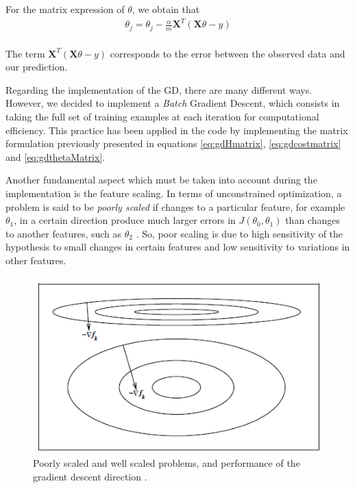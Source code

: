 \documentclass[a4paper, report, oneside, UKenglish]{memoir}
\begin{document}
For the matrix expression of $\theta$, we obtain that
\begin{equation}\label{eq:gdthetaMatrix}
\begin{split}
    \theta_{j} = \theta_{j} - \frac{\alpha}{m}\textbf{X}^T(\textbf{X}\theta - y)\\
\end{split}
\end{equation}

The term $\textbf{X}^T(\textbf{X}\theta - y)$ corresponds to the error between the observed data and our prediction.

Regarding the implementation of the GD, there are many different ways. However, we decided to implement a \textit{Batch} Gradient Descent, which consists in taking the full set of training examples at each iteration for computational efficiency. This practice has been applied in the code by implementing the matrix formulation previously presented in equations \eqref{eq:gdHmatrix}, \eqref{eq:gdcostmatrix} and \eqref{eq:gdthetaMatrix}.

Another fundamental aspect which must be taken into account during the implementation is the feature scaling. In terms of unconstrained optimization, a problem is said to be \textit{poorly scaled} if changes to a particular feature, for example $\theta_{1}$, in a certain direction produce much larger errors in $J(\theta_{0},\theta_{1})$ than changes to another features, such as $\theta_{2}$ \cite{numericalopt}. So, poor scaling is due to high sensitivity of the hypothesis to small changes in certain features and low sensitivity to variations in other features. 

\begin{figure}[hbt]
    \centering
    \includegraphics{fitting/PoorScaling_GradDesc.PNG}
    \caption{Poorly scaled and well scaled problems, and performance of the gradient descent direction \cite{numericalopt}.}
    \label{fig:scaling_gd}
\end{figure}
\end{document}
